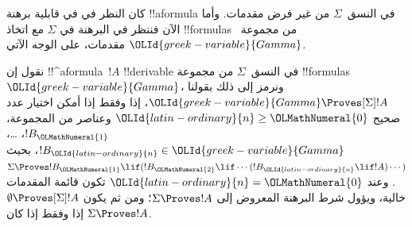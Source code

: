 \documentclass[../../../include/open-logic-section]{subfiles}
\begin{document}


كان النظر في  في قابلية برهنة !!a{formula}
في النسق~$\Sigma$ من غير فرض مقدمات. وأما الآن فننظر في البرهنة في
$\Sigma$ مع اتخاذ !!{formula}s من مجموعة~$\OLId{greek-variable}{Gamma}$ مقدمات، على الوجه الآتي.

\begin{defn}
  نقول إن !!^a{formula}~$!A$ !!{derivable} في النسق~$\Sigma$ من مجموعة
  !!{formula}s $\OLId{greek-variable}{Gamma}$، ونرمز إلى ذلك بقولنا $\OLId{greek-variable}{Gamma} \Proves[\Sigma] !A$،
  إذا وفقط إذا أمكن اختيار عدد صحيح $\OLId{latin-ordinary}{n} \geq \OLMathNumeral{0}$ وعناصر من المجموعة،
  $!B_\OLMathNumeral{1}$، \dots، $!B_\OLId{latin-ordinary}{n} \in \OLId{greek-variable}{Gamma}$، بحيث
  $\Sigma \Proves !B_\OLMathNumeral{1} \lif (!B_\OLMathNumeral{2} \lif \cdots (!B_\OLId{latin-ordinary}{n} \lif !A)
  \cdots)$.
  وعند $\OLId{latin-ordinary}{n}=\OLMathNumeral{0}$ تكون قائمة المقدمات خالية، ويؤول شرط البرهنة المعروض إلى
  $\Sigma \Proves !A$؛ ومن ثم يكون
  $\emptyset \Proves[\Sigma] !A$ إذا وفقط إذا كان $\Sigma \Proves !A$.
\end{defn}
\end{document}
